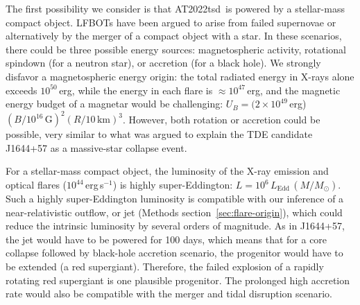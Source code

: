 \documentclass{nature_plusfigure}
\newcommand{\at}{AT2022tsd}
\begin{document}
\begin{methods}
The first possibility we consider is that \at\ is powered by a stellar-mass compact object. LFBOTs have been argued to arise from failed supernovae\cite{Perley2019,Margutti2019} or alternatively by the merger of a compact object with a star\cite{Metzger2022}. In these scenarios, there could be three possible energy sources: magnetospheric activity, rotational spindown (for a neutron star), or accretion (for a black hole). We strongly disfavor a magnetospheric energy origin: the total radiated energy in X-rays alone exceeds $10^{50}\,$erg, while the energy in each flare is $\approx10^{47}\,$erg, and the magnetic energy budget of a magnetar would be challenging: $U_B = (2\times10^{49}\,$erg)$(B/10^{16}\,\mathrm{G})^2 (R/10\,\mathrm{km})^3$. However, both rotation or accretion could be possible, very similar to what was argued to explain the TDE candidate J1644+57 as a massive-star collapse event\cite{Quataert2012}. 

For a stellar-mass compact object, the luminosity of the X-ray emission and optical flares ($10^{44}\,$erg\,s$^{-1}$) is highly super-Eddington: $L=10^{6}\,L_\mathrm{Edd}\,(M/M_\odot)$. Such a highly super-Eddington luminosity is compatible with our inference of a near-relativistic outflow, or jet (Methods section~\ref{sec:flare-origin}), which could reduce the intrinsic luminosity by several orders of magnitude. As in J1644+57, the jet would have to be powered for 100 days, which means that for a core collapse followed by black-hole accretion scenario\cite{WoosleyHeger2012}, the progenitor would have to be extended (a red supergiant\cite{Quataert2012}). Therefore, the failed explosion of a rapidly rotating red supergiant is one plausible progenitor. The prolonged high accretion rate would also be compatible with the merger and tidal disruption scenario\cite{Metzger2022}.


\end{methods}
\end{document}
